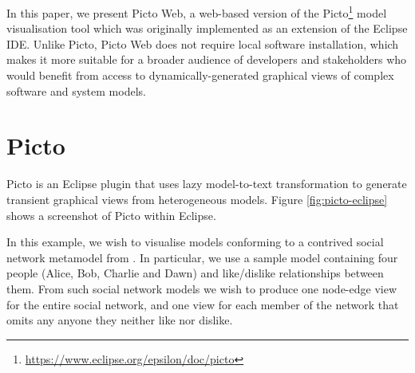 \documentclass[sigconf,review]{acmart}
\begin{document}


In this paper, we present Picto Web, a web-based version of the Picto\footnote{\url{https://www.eclipse.org/epsilon/doc/picto}} \cite{dimitris2020picto} model visualisation tool which was originally implemented as an extension of the Eclipse IDE. Unlike Picto, Picto Web does not require local software installation, which makes it more suitable for a broader audience of developers and stakeholders who would benefit from access to dynamically-generated graphical views of complex software and system models.

\section{Picto}
\label{sec:picto}

Picto \cite{dimitris2020picto} is an Eclipse plugin that uses lazy model-to-text transformation to generate transient graphical views from heterogeneous models. Figure \ref{fig:picto-eclipse} shows a screenshot of Picto within Eclipse. 

In this example, we wish to visualise models conforming to a contrived social network metamodel from \cite{dimitris2020picto}. In particular, we use a sample model containing four people (Alice, Bob,  Charlie and Dawn) and like/dislike relationships between them. From such social network models we wish to produce one node-edge view for the entire social network, and one view for each member of the network that omits any anyone they neither like nor dislike.
\end{document}

